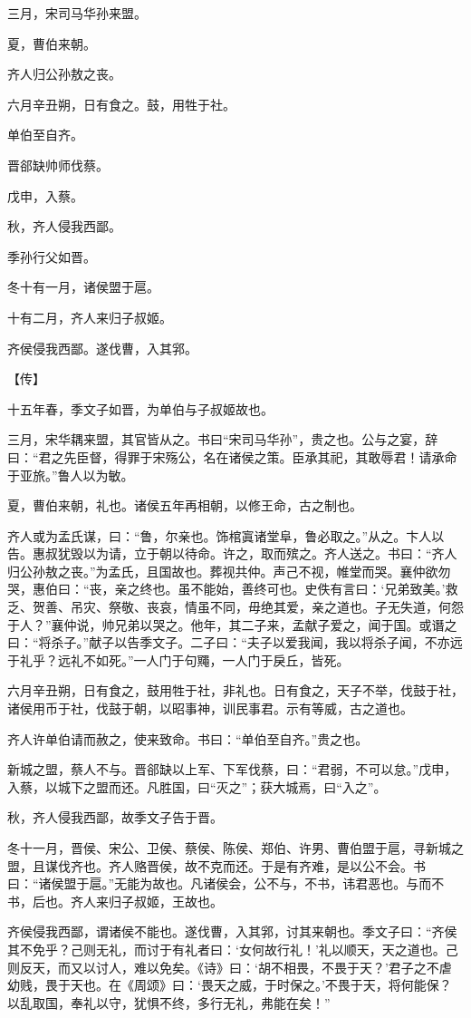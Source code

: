 \documentclass[a4paper,12pt,UTF8,twoside]{ctexbook}
\begin{document}
三月，宋司马华孙来盟。

夏，曹伯来朝。

齐人归公孙敖之丧。

六月辛丑朔，日有食之。鼓，用牲于社。

单伯至自齐。

晋郤缺帅师伐蔡。

戊申，入蔡。

秋，齐人侵我西鄙。

季孙行父如晋。

冬十有一月，诸侯盟于扈。

十有二月，齐人来归子叔姬。

齐侯侵我西鄙。遂伐曹，入其郛。

【传】

十五年春，季文子如晋，为单伯与子叔姬故也。

三月，宋华耦来盟，其官皆从之。书曰“宋司马华孙”，贵之也。公与之宴，辞曰：“君之先臣督，得罪于宋殇公，名在诸侯之策。臣承其祀，其敢辱君！请承命于亚旅。”鲁人以为敏。

夏，曹伯来朝，礼也。诸侯五年再相朝，以修王命，古之制也。

齐人或为孟氏谋，曰：“鲁，尔亲也。饰棺寘诸堂阜，鲁必取之。”从之。卞人以告。惠叔犹毁以为请，立于朝以待命。许之，取而殡之。齐人送之。书曰：“齐人归公孙敖之丧。”为孟氏，且国故也。葬视共仲。声己不视，帷堂而哭。襄仲欲勿哭，惠伯曰：“丧，亲之终也。虽不能始，善终可也。史佚有言曰：‘兄弟致美。’救乏、贺善、吊灾、祭敬、丧哀，情虽不同，毋绝其爱，亲之道也。子无失道，何怨于人？”襄仲说，帅兄弟以哭之。他年，其二子来，孟献子爱之，闻于国。或谮之曰：“将杀子。”献子以告季文子。二子曰：“夫子以爱我闻，我以将杀子闻，不亦远于礼乎？远礼不如死。”一人门于句鼆，一人门于戾丘，皆死。

六月辛丑朔，日有食之，鼓用牲于社，非礼也。日有食之，天子不举，伐鼓于社，诸侯用币于社，伐鼓于朝，以昭事神，训民事君。示有等威，古之道也。

齐人许单伯请而赦之，使来致命。书曰：“单伯至自齐。”贵之也。

新城之盟，蔡人不与。晋郤缺以上军、下军伐蔡，曰：“君弱，不可以怠。”戊申，入蔡，以城下之盟而还。凡胜国，曰“灭之”；获大城焉，曰“入之”。

秋，齐人侵我西鄙，故季文子告于晋。

冬十一月，晋侯、宋公、卫侯、蔡侯、陈侯、郑伯、许男、曹伯盟于扈，寻新城之盟，且谋伐齐也。齐人赂晋侯，故不克而还。于是有齐难，是以公不会。书曰：“诸侯盟于扈。”无能为故也。凡诸侯会，公不与，不书，讳君恶也。与而不书，后也。齐人来归子叔姬，王故也。

齐侯侵我西鄙，谓诸侯不能也。遂伐曹，入其郛，讨其来朝也。季文子曰：“齐侯其不免乎？己则无礼，而讨于有礼者曰：‘女何故行礼！’礼以顺天，天之道也。己则反天，而又以讨人，难以免矣。《诗》曰：‘胡不相畏，不畏于天？’君子之不虐幼贱，畏于天也。在《周颂》曰：‘畏天之威，于时保之。’不畏于天，将何能保？以乱取国，奉礼以守，犹惧不终，多行无礼，弗能在矣！”
\end{document}

